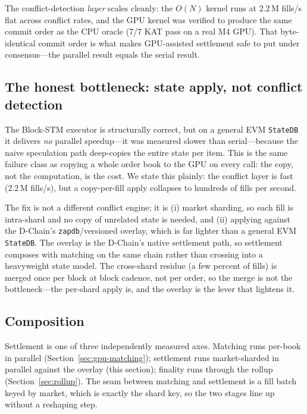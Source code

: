 The conflict-detection \emph{layer} scales cleanly: the $O(N)$ kernel runs at 2.2\,M fills/s
flat across conflict rates, and the GPU kernel was verified to produce the same commit order
as the CPU oracle (7/7 KAT pass on a real M4 GPU). That byte-identical commit order is what
makes GPU-assisted settlement safe to put under consensus---the parallel result equals the
serial result.

\subsection{The honest bottleneck: state apply, not conflict detection}

The Block-STM executor is structurally correct, but on a general EVM \texttt{StateDB} it
delivers \emph{no} parallel speedup---it was measured slower than serial---because the naive
speculation path deep-copies the entire state per item. This is the same failure class as
copying a whole order book to the GPU on every call: the copy, not the computation, is the
cost. We state this plainly: the conflict layer is fast (2.2\,M fills/s), but a copy-per-fill
apply collapses to hundreds of fills per second.

The fix is not a different conflict engine; it is (i) market sharding, so each fill is
intra-shard and no copy of unrelated state is needed, and (ii) applying against the D-Chain's
\texttt{zapdb}/versioned overlay, which is far lighter than a general EVM \texttt{StateDB}.
The overlay is the D-Chain's native settlement path, so settlement composes with matching on
the same chain rather than crossing into a heavyweight state model. The cross-shard residue
(a few percent of fills) is merged once per block at block cadence, not per order, so the
merge is not the bottleneck---the per-shard apply is, and the overlay is the lever that
lightens it.

\subsection{Composition}

Settlement is one of three independently measured axes. Matching runs per-book in parallel
(Section~\ref{sec:gpu-matching}); settlement runs market-sharded in parallel against the
overlay (this section); finality runs through the rollup (Section~\ref{sec:rollup}). The
seam between matching and settlement is a fill batch keyed by market, which is exactly the
shard key, so the two stages line up without a reshaping step.

